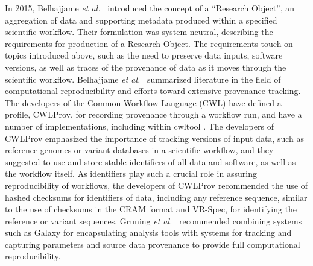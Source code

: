 \documentclass[10pt,letterpaper]{article}
\begin{document}
In 2015, Belhajjame \textit{et al.}~\cite{Belhajjame2015} introduced
the concept of a ``Research Object'', an aggregation of data and
supporting metadata produced within a specified scientific
workflow. Their formulation was system-neutral, describing the
requirements for production of a Research Object. The requirements
touch on topics introduced above, such as the need to preserve data
inputs, software versions, as well as traces of the provenance of data
as it moves through the scientific workflow. Belhajjame
\textit{et al.}~\cite{Belhajjame2015} summarized literature in the field of
computational reproducibility and efforts toward extensive provenance
tracking. The developers of the Common Workflow Language (CWL)
\cite{cwl} have defined a profile, CWLProv, for recording provenance
through a workflow run, and have a number of implementations,
including within cwltool \cite{Khan2018}. The developers of CWLProv
emphasized the importance of tracking versions of input data, such as
reference genomes or variant databases in a scientific workflow, and
they suggested to use and store stable identifiers of all data and
software, as well as the workflow itself. As identifiers play such a
crucial role in assuring reproducibility of workflows, the developers
of CWLProv recommended the use of hashed checksums for identifiers of
data, including any reference sequence, similar to the use of
checksums in the CRAM format and VR-Spec, for identifying the
reference or variant sequences. Gruning
\textit{et al.}~\cite{Gruning2018} recommended combining systems such as Galaxy
for encapsulating analysis tools with systems for tracking and
capturing parameters and source data provenance to provide full
computational reproducibility.
\end{document}
